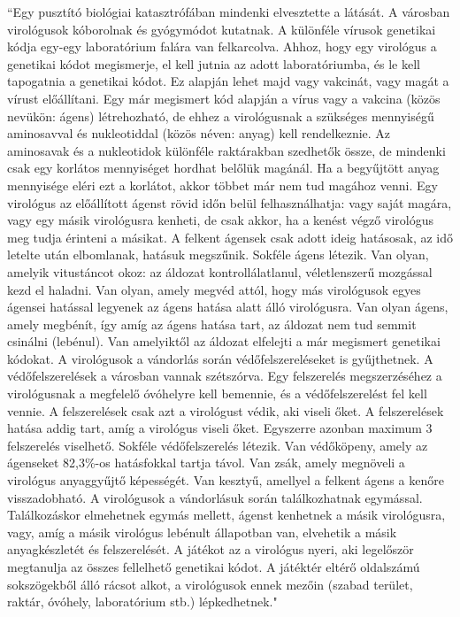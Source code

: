 ``Egy pusztító biológiai katasztrófában mindenki elvesztette a látását. A városban virológusok kóborolnak és gyógymódot kutatnak.
A különféle vírusok genetikai kódja egy-egy laboratórium falára van felkarcolva. Ahhoz, hogy egy virológus a genetikai kódot megismerje, el kell jutnia az adott laboratóriumba, és le kell tapogatnia a genetikai kódot. Ez alapján lehet majd vagy vakcinát, vagy magát a vírust előállítani.
Egy már megismert kód alapján a vírus vagy a vakcina (közös nevükön: ágens) létrehozható, de ehhez a virológusnak a szükséges mennyiségű aminosavval és nukleotiddal (közös néven: anyag) kell rendelkeznie. Az aminosavak és a nukleotidok különféle raktárakban szedhetők össze, de mindenki csak egy korlátos mennyiséget hordhat belőlük magánál. Ha a begyűjtött anyag mennyisége eléri ezt a korlátot, akkor többet már nem tud magához venni.
Egy virológus az előállított ágenst rövid időn belül felhasználhatja: vagy saját magára, vagy egy másik virológusra kenheti, de csak akkor, ha a kenést végző virológus meg tudja érinteni a másikat. A felkent ágensek csak adott ideig hatásosak, az idő letelte után elbomlanak, hatásuk megszűnik.
Sokféle ágens létezik. Van olyan, amelyik vitustáncot okoz: az áldozat kontrollálatlanul, véletlenszerű mozgással kezd el haladni. Van olyan, amely megvéd attól, hogy más virológusok egyes ágensei hatással legyenek az ágens hatása alatt álló virológusra. Van olyan ágens, amely megbénít, így amíg az ágens hatása tart, az áldozat nem tud semmit csinálni (lebénul). Van amelyiktől az áldozat elfelejti a már megismert genetikai kódokat.
A virológusok a vándorlás során védőfelszereléseket is gyűjthetnek. A védőfelszerelések a városban vannak szétszórva. Egy felszerelés megszerzéséhez a virológusnak a megfelelő óvóhelyre kell bemennie, és a védőfelszerelést fel kell vennie. A felszerelések csak azt a virológust védik, aki viseli őket. A felszerelések hatása addig tart, amíg a virológus viseli őket. Egyszerre azonban maximum 3 felszerelés viselhető.
Sokféle védőfelszerelés létezik. Van védőköpeny, amely az ágenseket 82,3\%-os hatásfokkal tartja távol. Van zsák, amely megnöveli a virológus anyaggyűjtő képességét. Van kesztyű, amellyel a felkent ágens a kenőre visszadobható.
A virológusok a vándorlásuk során találkozhatnak egymással. Találkozáskor elmehetnek egymás mellett, ágenst kenhetnek a másik virológusra, vagy, amíg a másik virológus lebénult állapotban van, elvehetik a másik anyagkészletét és felszerelését.
A játékot az a virológus nyeri, aki legelőször megtanulja az összes fellelhető genetikai kódot. A játéktér eltérő oldalszámú sokszögekből álló rácsot alkot, a virológusok ennek mezőin (szabad terület, raktár, óvóhely, laboratórium stb.) lépkedhetnek."

